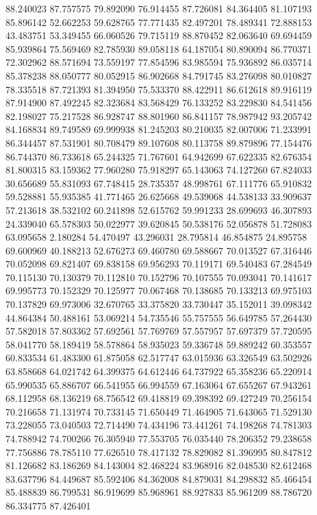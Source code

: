 88.240023
87.757575
79.892090
76.914455
87.726081
84.364405
81.107193
85.896142
52.662253
59.628765
77.771435
82.497201
78.489341
72.888153
43.483751
53.349455
66.060526
79.715119
88.870452
82.063640
69.694459
85.939864
75.569469
82.785930
89.058118
64.187054
80.890094
86.770371
72.302962
88.571694
73.559197
77.854596
83.985594
75.936892
86.035714
85.378238
88.050777
80.052915
86.902668
84.791745
83.276098
80.010827
78.335518
87.721393
81.394950
75.533370
88.422911
86.612618
89.916119
87.914900
87.492245
82.323684
83.568429
76.133252
83.229830
84.541456
82.198027
75.217528
86.928747
88.801960
86.841157
78.987942
93.205742
84.168834
89.749589
69.999938
81.245203
80.210035
82.007006
71.233991
86.344457
87.531901
80.708479
89.107608
80.113758
89.879896
77.154476
86.744370
86.733618
65.244325
71.767601
64.942699
67.622335
82.676354
81.800315
83.159362
77.960280
75.918297
65.143063
74.127260
67.824033
30.656689
55.831093
67.748415
28.735357
48.998761
67.111776
65.910832
59.528881
55.935385
41.771465
26.625668
49.539068
44.538133
33.909637
57.213618
38.532102
60.241898
52.615762
59.991233
28.699693
46.307893
24.339040
65.578303
50.022977
39.620845
50.538176
52.056878
51.728083
63.095658
2.180284
54.470497
43.296031
28.795814
46.854875
24.895758
69.600969
40.188213
52.676273
69.460780
69.588667
70.013527
67.316446
70.052098
69.821407
69.838158
69.956293
70.119171
69.540483
67.284549
70.115130
70.130379
70.112810
70.152796
70.107555
70.093041
70.141617
69.995773
70.152329
70.125977
70.067468
70.138685
70.133213
69.975103
70.137829
69.973006
32.670765
33.375820
33.730447
35.152011
39.098342
44.864384
50.488161
53.069214
54.735546
55.757555
56.649785
57.264430
57.582018
57.803362
57.692561
57.769769
57.557957
57.697379
57.720595
58.041770
58.189419
58.578864
58.935023
59.336748
59.889242
60.353557
60.833534
61.483300
61.875058
62.517747
63.015936
63.326549
63.502926
63.858668
64.021742
64.399375
64.612446
64.737922
65.358236
65.220914
65.990535
65.886707
66.541955
66.994559
67.163064
67.655267
67.943261
68.112958
68.136219
68.756542
69.418819
69.398392
69.427249
70.256154
70.216658
71.131974
70.733145
71.650449
71.464905
71.643065
71.529130
73.228055
73.040503
72.714490
74.434196
73.441261
74.198268
74.781303
74.788942
74.700266
76.305940
77.553705
76.035440
78.206352
79.238658
77.756886
78.785110
77.626510
78.417132
78.829082
81.396995
80.847812
81.126682
83.186269
84.143004
82.468224
83.968916
82.048530
82.612468
83.637796
84.449687
85.592406
84.362008
84.879031
84.298832
85.466454
85.488839
86.799531
86.919699
85.968961
88.927833
85.961209
88.786720
86.334775
87.426401
